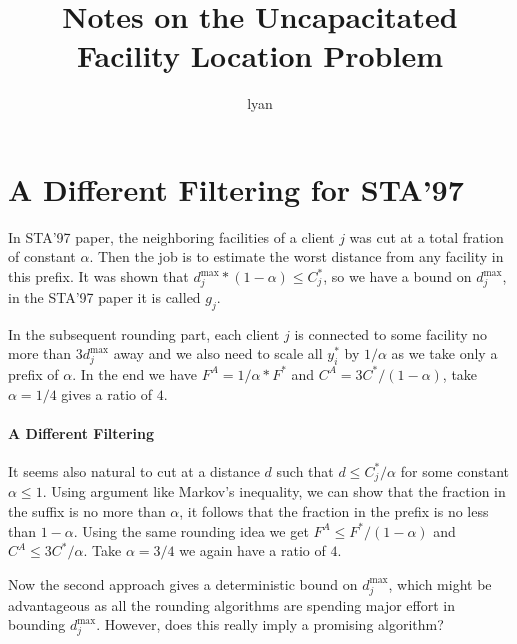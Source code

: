 \documentclass{article}[11pt]
\title{Notes on the Uncapacitated Facility Location Problem}
\author{lyan}
\begin{document}
\maketitle

\section{A Different Filtering for STA'97}
In STA'97 paper, the neighboring facilities of a client $j$ was cut at
a total fration of constant $\alpha$. Then the job is to estimate the
worst distance from any facility in this prefix. It was shown that
$d_j^{\max} * (1-\alpha) \leq C_j^\ast$, so we have a bound on
$d_j^{\max}$, in the STA'97 paper it is called $g_j$.

In the subsequent rounding part, each client $j$ is connected to some
facility no more than $3d_j^{\max}$ away and we also need to scale all
$y_i^\ast$ by $1/\alpha$ as we take only a prefix of $\alpha$. In the
end we have $F^A = 1/\alpha * F^\ast$ and $C^A = 3 C^\ast /
(1-\alpha)$, take $\alpha = 1/4$ gives a ratio of $4$.

\paragraph{A Different Filtering} It seems also natural to cut at a
distance $d$ such that $d \leq C_j^\ast / \alpha$ for some constant
$\alpha \leq 1$. Using argument like Markov's inequality, we can show
that the fraction in the suffix is no more than $\alpha$, it follows
that the fraction in the prefix is no less than $1-\alpha$. Using the
same rounding idea we get $F^A \leq F^\ast / (1-\alpha)$ and $C^A \leq
3C^\ast / \alpha$. Take $\alpha = 3/4$ we again have a ratio of $4$.

Now the second approach gives a deterministic bound on $d_j^{\max}$,
which might be advantageous as all the rounding algorithms are
spending major effort in bounding $d_j^{\max}$. However, does this
really imply a promising algorithm?
\end{document}
